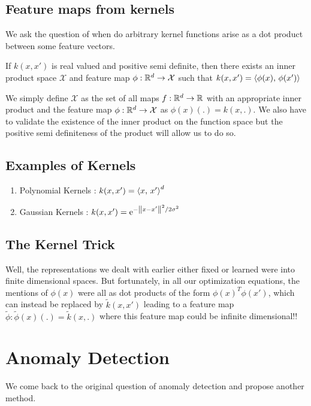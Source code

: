 \documentclass[11pt]{report}
\begin{document}
\subsection{Feature maps from kernels}
We ask the question of when do arbitrary kernel functions arise as a dot product between some feature vectors.
\begin{theorem}
If \(k(x,x')\) is real valued and positive semi definite, then there exists an inner product space \(\mathcal{X}\) and feature map \(\phi: \mathbb{R}^d \rightarrow \mathcal{X}\) such that \(k(x,x')=\left\langle{\phi(x)},\,{\phi(x')}\right\rangle\)
\end{theorem}
\vspace{1mm}
We simply define \(\mathcal{X}\) as the set of all maps \(f: \mathbb{R}^d \rightarrow \mathbb{R}\) with an appropriate inner product and the feature map \(\phi: \mathbb{R}^d \rightarrow \mathcal{X}\) as \(\phi(x)(.)=k(x,.)\).
We also have to validate the existence of the inner product on the function space but the positive semi definiteness of the product will allow us to do so.

\subsection{Examples of Kernels}

\begin{enumerate}[label=\textup{(\alph*)}, leftmargin=*, widest=b, align=left]



\item \label{mpp:gen_a_0} Polynomial Kernels : \(k(x,x')= \left\langle{x},\,{x'}\right\rangle^d\)
\item \label{mpp:gen_a_1} Gaussian Kernels : \(k(x,x')=\mathrm{e}^{-\left\lVert x-x' \right\rVert^2/2\sigma^2}\)
 \end{enumerate}


\subsection{The Kernel Trick}
Well, the representations we dealt with earlier either fixed or learned were into finite dimensional spaces. But fortunately, in all our optimization equations, the mentions of \(\phi(x)\) were all as dot products of the form \(\phi(x)^T\phi(x')\), which can instead be replaced by \(\tilde{k}(x,x')\) leading to a feature map \(\tilde{\phi} : \tilde{\phi}(x)(.)=\tilde{k}(x,.)\) where this feature map could be infinite dimensional!!

\section{Anomaly Detection}
We come back to the original question of anomaly detection and propose another method.
\end{document}
